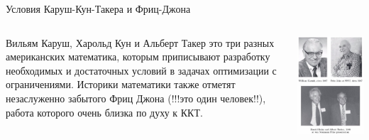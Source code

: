 \documentclass{beamer}
\begin{document}
\begin{frame}{Условия Каруш-Кун-Такера и Фриц-Джона}

\begin{columns}
\begin{column}{0.5\textwidth}
   \alert{Вильям Каруш, Харольд Кун и Альберт Такер} это три разных американских математика, которым приписывают разработку необходимых и достаточных условий в задачах оптимизации с ограничениями. Историки математики также отметят незаслуженно забытого \alert{Фриц Джона} (!!!это один человек!!), работа которого очень близка по духу к ККТ.
\end{column}
\begin{column}{0.5\textwidth}  %
    \begin{center}
     \includegraphics[width=1\textwidth]{kktf}
     \end{center}
\end{column}
\end{columns}

\end{frame}
\end{document}
